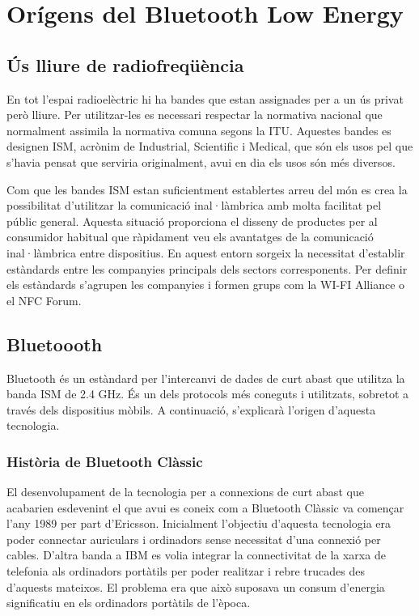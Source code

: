 \chapter{Orígens del Bluetooth Low Energy}\label{C:compaginacio}

\section{Ús lliure de radiofreqüència}
En tot l'espai radioelèctric hi ha bandes que estan assignades per a un ús privat però lliure.
Per utilitzar-les es necessari respectar la normativa nacional que normalment assimila la normativa comuna segons la ITU.
Aquestes bandes es designen ISM, acrònim de Industrial, Scientific i Medical, que són els usos pel que s'havia pensat que serviria originalment, avui en dia els usos són més diversos.

Com que les bandes ISM estan suficientment establertes arreu del món es crea la possibilitat d'utilitzar la comunicació inal·làmbrica amb molta facilitat pel públic general.
Aquesta situació proporciona el disseny de productes per al consumidor habitual que ràpidament veu els avantatges de la comunicació inal·làmbrica entre dispositius.
En aquest entorn sorgeix la necessitat d'establir estàndards entre les companyies principals dels sectors corresponents.
Per definir els estàndards s'agrupen les companyies i formen grups com la WI-FI Alliance o el NFC Forum.

\section{Bluetoooth}
Bluetooth és un estàndard per l'intercanvi de dades de curt abast que utilitza la banda ISM de 2.4 GHz.
És un dels protocols més coneguts i utilitzats, sobretot a través dels dispositius mòbils.
A continuació, s'explicarà l'origen d'aquesta tecnologia.

\subsection{Història de Bluetooth Clàssic}
El desenvolupament de la tecnologia per a connexions de curt abast que acabarien esdevenint el que avui es coneix com a Bluetooth Clàssic va començar l'any 1989 per part d'Ericsson.
Inicialment l'objectiu d'aquesta tecnologia era poder connectar auriculars i ordinadors sense necessitat d'una connexió per cables.
D'altra banda a IBM es volia integrar la connectivitat de la xarxa de telefonia als ordinadors portàtils per poder realitzar i rebre trucades des d'aquests mateixos.
El problema era que això suposava un consum d'energia significatiu en els ordinadors portàtils de l'època.

